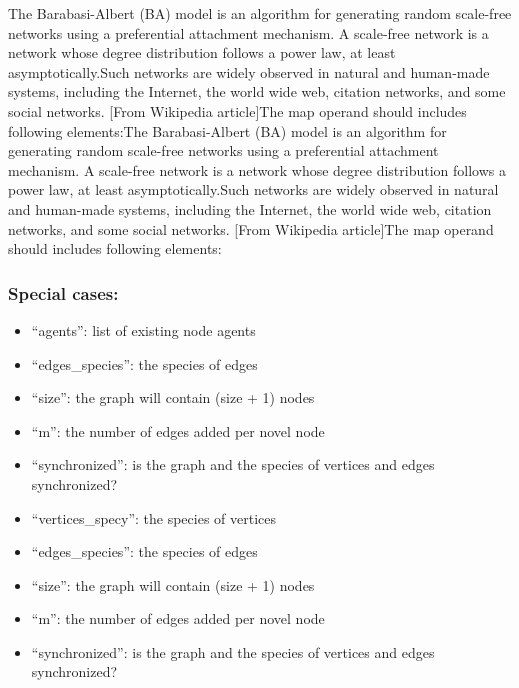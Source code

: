 \documentclass[]{book}
\providecommand{\tightlist}{%
  \setlength{\itemsep}{0pt}\setlength{\parskip}{0pt}}
\theoremstyle{definition}
\theoremstyle{definition}
\theoremstyle{definition}
\theoremstyle{remark}
\begin{document}
The Barabasi-Albert (BA) model is an algorithm for generating random
scale-free networks using a preferential attachment mechanism. A
scale-free network is a network whose degree distribution follows a
power law, at least asymptotically.Such networks are widely observed in
natural and human-made systems, including the Internet, the world wide
web, citation networks, and some social networks. {[}From Wikipedia
article{]}The map operand should includes following elements:The
Barabasi-Albert (BA) model is an algorithm for generating random
scale-free networks using a preferential attachment mechanism. A
scale-free network is a network whose degree distribution follows a
power law, at least asymptotically.Such networks are widely observed in
natural and human-made systems, including the Internet, the world wide
web, citation networks, and some social networks. {[}From Wikipedia
article{]}The map operand should includes following elements:

\subsubsection{Special cases:}\label{special-cases-67}

\begin{itemize}
\tightlist
\item
  ``agents'': list of existing node agents\\
\item
  ``edges\_species'': the species of edges\\
\item
  ``size'': the graph will contain (size + 1) nodes\\
\item
  ``m'': the number of edges added per novel node\\
\item
  ``synchronized'': is the graph and the species of vertices and edges
  synchronized?\\
\item
  ``vertices\_specy'': the species of vertices\\
\item
  ``edges\_species'': the species of edges\\
\item
  ``size'': the graph will contain (size + 1) nodes\\
\item
  ``m'': the number of edges added per novel node\\
\item
  ``synchronized'': is the graph and the species of vertices and edges
  synchronized?
\end{itemize}
\end{document}
